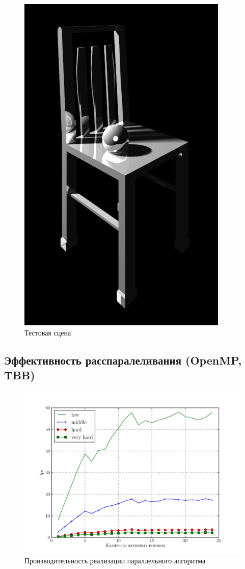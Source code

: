 \documentclass[12pt, a4paper, utf8]{article}
\begin{document}
\begin{figure}[H]
\centering
\includegraphics[scale=0.5]{imgs/stul.png}
\caption{Тестовая сцена}\label{fig:test_scene}
\end{figure}

\subsection{Эффективность расспаралеливания (OpenMP, TBB)}



\begin{figure}[H]
\centering
\includegraphics[width=\textwidth]{perf/table_perf.pdf}
\caption{Производительность реализации параллельного алгоритма}\label{fig:perf_parallel_alg}
\end{figure}
\end{document}
